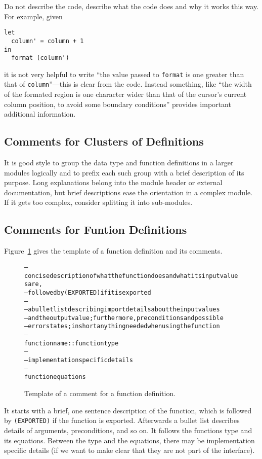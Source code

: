 \documentclass{report}
\newcommand{\code}[1]{\texttt{#1}}
\newcommand{\schema}[1]{\textrm{#1}}
\begin{document}
Do not describe the code, describe what the code does and why it works this
way.  For example, given
%
\begin{verbatim}
let
  column' = column + 1
in
  format (column')
\end{verbatim}
%
it is not very helpful to write ``the value passed to \texttt{format} is one
greater than that of \texttt{column}''---this is clear from the code.  Instead
something, like ``the width of the formated region is one character wider than
that of the cursor's current column position, to avoid some boundary
conditions'' provides important additional information.

\subsection{Comments for Clusters of Definitions}

It is good style to group the data type and function definitions in a larger
modules logically and to prefix each such group with a brief description of
its purpose.  Long explanations belong into the module header or external
documentation, but brief descriptions ease the orientation in a complex
module.  If it gets too complex, consider splitting it into sub-modules.

\subsection{Comments for Funtion Definitions}

Figure~\ref{fig:fun-comment} gives the template of a function definition and
its comments.
%
\begin{figure}
\begin{alltt}
-- \schema{concise description of what the function does and what its input values are,}
-- \schema{followed by \texttt{(EXPORTED)} if it is exported}
--
-- \schema{a bullet list describing import details about the input values}
-- \schema{and the output value; furthermore, preconditions and possible}
-- \schema{error states; in short anything needed when using the function}
--
\schema{function name} :: \schema{function type}
--
-- \schema{implementation specific details}
--
\schema{function equations}
\end{alltt}
\caption{Template of a comment for a function definition.}
\label{fig:fun-comment}
\end{figure}
%
It starts with a brief, one sentence description of the function, which is
followed by \code{(EXPORTED)} if the function is exported.  Afterwards a
bullet list describes details of arguments, preconditions, and so on.  It
follows the functions type and its equations.  Between the type and the
equations, there may be implementation specific details (if we want to make
clear that they are not part of the interface).
\end{document}
